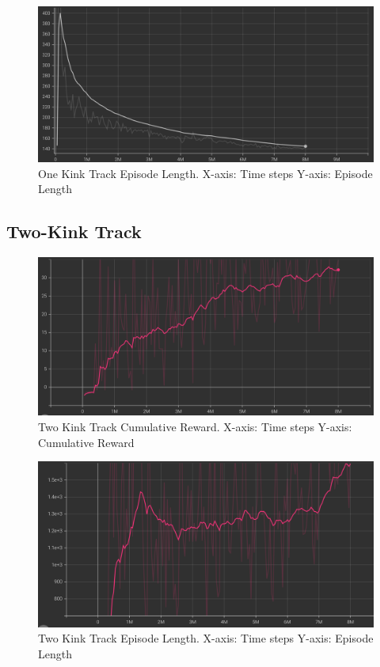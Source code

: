 \begin{figure}[H]
    \centering
    \includegraphics[width=1.0\textwidth]{images/graphs/OneKink-Episode.png}
    \caption{One Kink Track Episode Length.  X-axis: Time steps  Y-axis: Episode Length}
    \label{fig:4}
\end{figure}


\subsection{Two-Kink Track}

\begin{figure}[H]
    \centering
    \includegraphics[width=1.0\textwidth]{images/graphs/TwoKink-Reward.png}
    \caption{Two Kink Track Cumulative Reward.  X-axis: Time steps  Y-axis: Cumulative Reward}
    \label{fig:5}
\end{figure}

\begin{figure}[H]
    \centering
    \includegraphics[width=1.0\textwidth]{images/graphs/TwoKink-Episode.png}
    \caption{Two Kink Track Episode Length.  X-axis: Time steps  Y-axis: Episode Length}
    \label{fig:6}
\end{figure}


